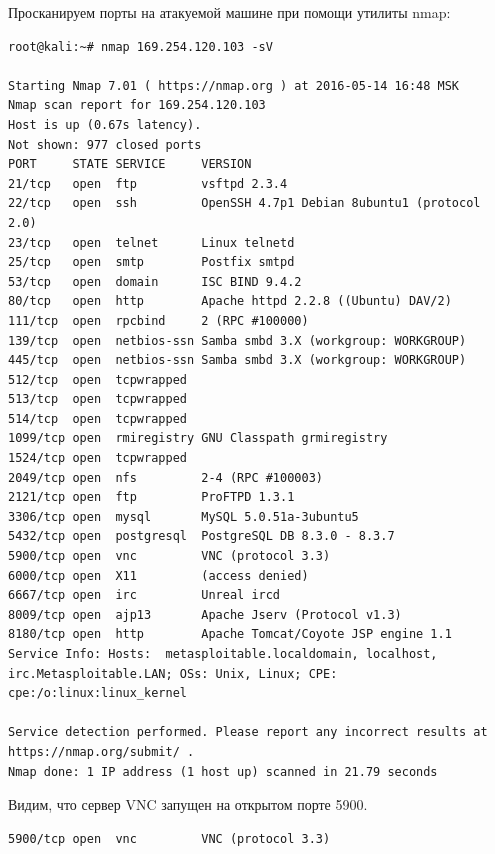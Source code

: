 \documentclass[10pt,a4paper]{report}
\begin{document}
		Просканируем порты на атакуемой машине при помощи утилиты nmap:
		\begin{lstlisting}
root@kali:~# nmap 169.254.120.103 -sV

Starting Nmap 7.01 ( https://nmap.org ) at 2016-05-14 16:48 MSK
Nmap scan report for 169.254.120.103
Host is up (0.67s latency).
Not shown: 977 closed ports
PORT     STATE SERVICE     VERSION
21/tcp   open  ftp         vsftpd 2.3.4
22/tcp   open  ssh         OpenSSH 4.7p1 Debian 8ubuntu1 (protocol 2.0)
23/tcp   open  telnet      Linux telnetd
25/tcp   open  smtp        Postfix smtpd
53/tcp   open  domain      ISC BIND 9.4.2
80/tcp   open  http        Apache httpd 2.2.8 ((Ubuntu) DAV/2)
111/tcp  open  rpcbind     2 (RPC #100000)
139/tcp  open  netbios-ssn Samba smbd 3.X (workgroup: WORKGROUP)
445/tcp  open  netbios-ssn Samba smbd 3.X (workgroup: WORKGROUP)
512/tcp  open  tcpwrapped
513/tcp  open  tcpwrapped
514/tcp  open  tcpwrapped
1099/tcp open  rmiregistry GNU Classpath grmiregistry
1524/tcp open  tcpwrapped
2049/tcp open  nfs         2-4 (RPC #100003)
2121/tcp open  ftp         ProFTPD 1.3.1
3306/tcp open  mysql       MySQL 5.0.51a-3ubuntu5
5432/tcp open  postgresql  PostgreSQL DB 8.3.0 - 8.3.7
5900/tcp open  vnc         VNC (protocol 3.3)
6000/tcp open  X11         (access denied)
6667/tcp open  irc         Unreal ircd
8009/tcp open  ajp13       Apache Jserv (Protocol v1.3)
8180/tcp open  http        Apache Tomcat/Coyote JSP engine 1.1
Service Info: Hosts:  metasploitable.localdomain, localhost, irc.Metasploitable.LAN; OSs: Unix, Linux; CPE: cpe:/o:linux:linux_kernel

Service detection performed. Please report any incorrect results at https://nmap.org/submit/ .
Nmap done: 1 IP address (1 host up) scanned in 21.79 seconds

		\end{lstlisting}
		
		Видим, что сервер VNC запущен на открытом порте 5900.
		\begin{lstlisting}
5900/tcp open  vnc         VNC (protocol 3.3)
		\end{lstlisting}
		
\end{document}
